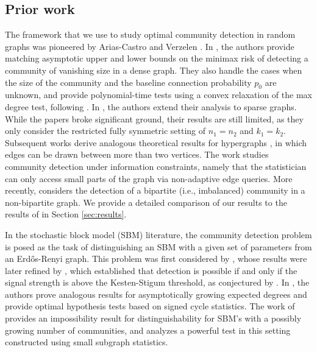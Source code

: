 \documentclass{article}
\begin{document}
\subsection{Prior work}\label{sec_litreview}

 The framework that we use to study optimal community detection in random graphs was pioneered by Arias-Castro and Verzelen \cite{arias2014community, verzelen2015community}. 
 In \cite{arias2014community}, the authors provide matching asymptotic upper and lower bounds on the minimax risk of detecting a community of vanishing size in a dense graph. 
 They also handle the cases when the size of the community and the baseline connection probability $p_0$ are unknown, and provide polynomial-time tests using a convex relaxation of the max degree test, following \cite{berthet2013optimal}. 
 In \cite{verzelen2015community}, the authors extend their analysis to sparse graphs. 
 While the papers \cite{arias2014community, verzelen2015community} broke significant ground, their results are still limited, as they only consider the restricted fully symmetric setting of $n_1 = n_2$ and $k_1 = k_2$. 
 Subsequent works derive analogous theoretical results for hypergraphs \cite{yuan2022testing, yuan2022sharp}, in which edges can be drawn between more than two vertices. 
 The work \cite{huleihel2024random} studies community detection under information constraints, namely that the statistician can only access small parts of the graph via non-adaptive edge queries. 
 More recently, \cite{rotenberg2024planted} considers the detection of a bipartite (i.e., imbalanced) community in a non-bipartite graph. We provide a detailed comparison of our results to the results of \cite{rotenberg2024planted} in Section \ref{sec:results}. 
 
 In the stochastic block model (SBM) literature, the community detection problem is posed as the task of distinguishing an SBM with a given set of parameters from an Erd\H{o}s-Renyi graph. This problem was first considered by \cite{janson2010asymptotic}, whose results were later refined by \cite{mossel2015reconstruction, massoulie2014community, abbe2015community}, which established that detection is possible if and only if the signal strength is above the Kesten-Stigum threshold, as conjectured by \cite{decelle2011asymptotic}. In \cite{banerjee2018contiguity, banerjee2017optimal}, the authors prove analogous results for asymptotically growing expected degrees and provide optimal hypothesis tests based on signed cycle statistics. The work of \cite{banks2016information} provides an impossibility result for distinguishability for SBM's with a possibly growing number of communities, and \cite{gao2017testing} analyzes a powerful test in this setting constructed using small subgraph statistics. 
\end{document}
